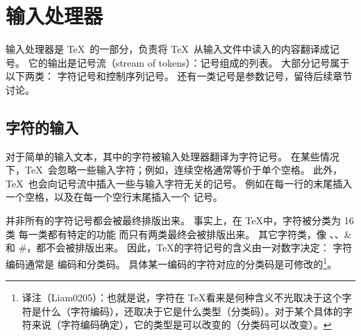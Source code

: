 \documentclass{book}
\begin{document}
\section{输入处理器}

输入处理器是 \TeX\ 的一部分，负责将 \TeX\ 从输入文件中读入的内容翻译成记号。
它的输出是记号流（stream of tokens）：记号组成的列表。
大部分记号属于以下两类：
字符记号和控制序列记号。
还有一类记号是参数记号，留待后续章节讨论。

\subsection{字符的输入}

对于简单的输入文本，其中的字符被输入处理器翻译为字符记号。
在某些情况下，\TeX\ 会忽略一些输入字符；例如，连续空格通常等价于单个空格。
此外，\TeX\ 也会向记号流中插入一些与输入字符无关的记号。
例如在每一行的末尾插入一个空格，以及在每一个空行末尾插入一个  记号。

并非所有的字符记号都会被最终排版出来。
事实上，在 \TeX 中，字符被分类为 16 类
\ldash 每一类都有特定的功能\rdash
而只有两类最终会被排版出来。
其它字符类，像 、、\n\&
和 \n\#，都不会被排版出来。
因此，\TeX 的字符记号的含义由一对数字决定：
字符编码\ldash 通常是 \ascii 编码\rdash 和分类码。
具体某一编码的字符对应的分类码是可修改的\footnote{译注（Liam0205）：也就是说，字符在 \TeX 看来是何种含义不光取决于这个字符是什么（字符编码），还取决于它是什么类型（分类码）。对于某个具体的字符来说（字符编码确定），它的类型是可以改变的（分类码可以改变）。}。
\end{document}
